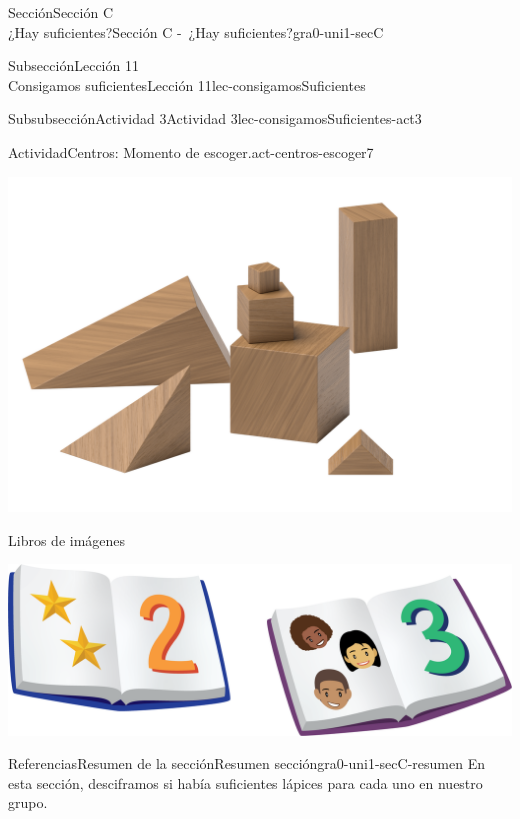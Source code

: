 \begin{sectionptx}{Sección}{{\Large Sección C\\}¿Hay suficientes?}{}{Sección C -~¿Hay suficientes?}{}{}{gra0-uni1-secC}
\begin{subsectionptx}{Subsección}{{\normalsize Lección 11\\[-0.05cm]}Consigamos suficientes}{}{Lección 11}{}{}{lec-consigamosSuficientes}
\begin{subsubsectionptx}{Subsubsección}{Actividad 3}{}{Actividad 3}{}{}{lec-consigamosSuficientes-act3}
\begin{activity}{Actividad}{Centros: Momento de escoger.}{act-centros-escoger7}
\begin{sidebyside}{2}{0.025}{0.025}{0.05}
\begin{sbspanel}{0.45}
\includegraphics[max width=\linewidth, center]{external/png-source/K.1.A Beta Student Workbook.Geoblocks.png}
\end{sbspanel}%
\begin{sbspanel}{0.45}%
Libros de imágenes%
\par
\includegraphics[max width=\linewidth, center]{external/png-source/K.1.D Beta Student Workbooks.Books.png}
\end{sbspanel}%
\end{sidebyside}%
\end{activity}%
\end{subsubsectionptx}
\end{subsectionptx}
%
%
\typeout{************************************************}
\typeout{************************************************}
%
\begin{references-subsection}{Referencias}{Resumen de la sección}{}{Resumen sección}{}{}{gra0-uni1-secC-resumen}
En esta sección, desciframos si había suficientes lápices para cada uno en nuestro grupo.%
\begin{image}{0}{1}{0}{}%

\end{image}
\end{references-subsection}
\end{sectionptx}
